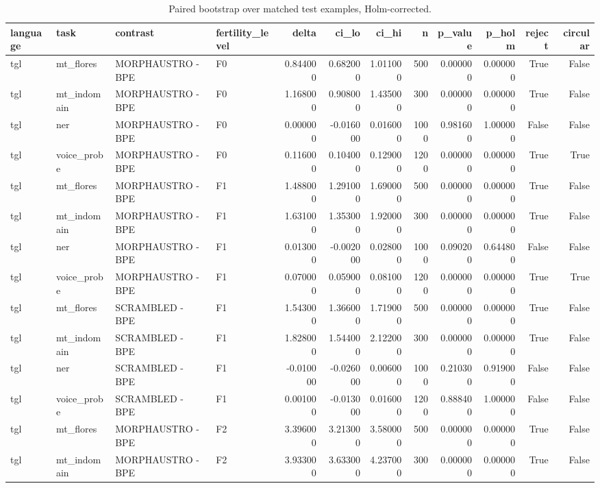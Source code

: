 \begin{table}
\caption{Paired bootstrap over matched test examples, Holm-corrected.}
\label{tab:bootstrap}
\begin{tabular}{llllrrrrrrrr}
\toprule
language & task & contrast & fertility\_level & delta & ci\_lo & ci\_hi & n & p\_value & p\_holm & reject & circular \\
\midrule
tgl & mt\_flores & MORPHAUSTRO - BPE & F0 & 0.844000 & 0.682000 & 1.011000 & 500 & 0.000000 & 0.000000 & True & False \\
tgl & mt\_indomain & MORPHAUSTRO - BPE & F0 & 1.168000 & 0.908000 & 1.435000 & 300 & 0.000000 & 0.000000 & True & False \\
tgl & ner & MORPHAUSTRO - BPE & F0 & 0.000000 & -0.016000 & 0.016000 & 1000 & 0.981600 & 1.000000 & False & False \\
tgl & voice\_probe & MORPHAUSTRO - BPE & F0 & 0.116000 & 0.104000 & 0.129000 & 1200 & 0.000000 & 0.000000 & True & True \\
tgl & mt\_flores & MORPHAUSTRO - BPE & F1 & 1.488000 & 1.291000 & 1.690000 & 500 & 0.000000 & 0.000000 & True & False \\
tgl & mt\_indomain & MORPHAUSTRO - BPE & F1 & 1.631000 & 1.353000 & 1.920000 & 300 & 0.000000 & 0.000000 & True & False \\
tgl & ner & MORPHAUSTRO - BPE & F1 & 0.013000 & -0.002000 & 0.028000 & 1000 & 0.090200 & 0.644800 & False & False \\
tgl & voice\_probe & MORPHAUSTRO - BPE & F1 & 0.070000 & 0.059000 & 0.081000 & 1200 & 0.000000 & 0.000000 & True & True \\
tgl & mt\_flores & SCRAMBLED - BPE & F1 & 1.543000 & 1.366000 & 1.719000 & 500 & 0.000000 & 0.000000 & True & False \\
tgl & mt\_indomain & SCRAMBLED - BPE & F1 & 1.828000 & 1.544000 & 2.122000 & 300 & 0.000000 & 0.000000 & True & False \\
tgl & ner & SCRAMBLED - BPE & F1 & -0.010000 & -0.026000 & 0.006000 & 1000 & 0.210300 & 0.919000 & False & False \\
tgl & voice\_probe & SCRAMBLED - BPE & F1 & 0.001000 & -0.013000 & 0.016000 & 1200 & 0.888400 & 1.000000 & False & False \\
tgl & mt\_flores & MORPHAUSTRO - BPE & F2 & 3.396000 & 3.213000 & 3.580000 & 500 & 0.000000 & 0.000000 & True & False \\
tgl & mt\_indomain & MORPHAUSTRO - BPE & F2 & 3.933000 & 3.633000 & 4.237000 & 300 & 0.000000 & 0.000000 & True & False \\

\end{tabular}
\end{table}
